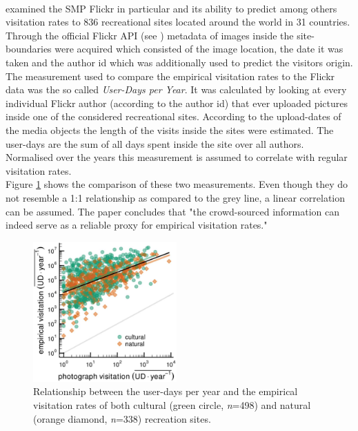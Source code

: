\paragraph*{\textcite{Wood2013}} examined the SMP Flickr in particular and its ability to predict among others visitation rates to 836 recreational sites located around the world in 31 countries. Through the official Flickr API (see ) metadata of images inside the site-boundaries were acquired which consisted of the image location, the date it was taken and the author id which was additionally used to predict the visitors origin. The measurement used to compare the empirical visitation rates to the Flickr data was the so called \textit{User-Days per Year}. It was calculated by looking at every individual Flickr author (according to the author id) that ever uploaded pictures inside one of the considered recreational sites. According to the upload-dates of the media objects the length of the visits inside the sites were estimated. The user-days are the sum of all days spent inside the site over all authors. Normalised over the years this measurement is assumed to correlate with regular visitation rates. \\
Figure \ref{fig:wood_user_days} shows the comparison of these two measurements. Even though they do not resemble a 1:1 relationship as compared to the grey line, a linear correlation can be assumed. The paper concludes that "the crowd-sourced information can indeed serve as a reliable proxy for empirical visitation rates."

\begin{figure}[h]
   \begin{center}
   \includegraphics[width=0.49\textwidth]{img/wood_user_photodays.pdf}
   \end{center}
   \caption{Relationship between the user-days per year and the empirical visitation rates of both cultural (green circle, \textit{n}=498) and natural (orange diamond, \textit{n}=338) recreation sites.}
   \label{fig:wood_user_days}
\end{figure}

